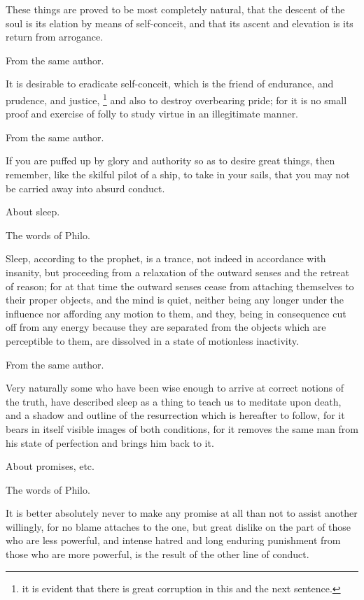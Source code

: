 These things are proved to be most completely natural, that the descent of the soul is its elation by
means of self-conceit, and that its ascent and elevation is its return from arrogance.

From the same author.

It is desirable to eradicate self-conceit, which is the friend of endurance, and prudence, and
justice, \footnote{it is evident that there is great corruption in this and the next sentence.} and also to destroy
overbearing pride; for it is no small proof and exercise of folly to study virtue in an illegitimate
manner.

From the same author.

If you are puffed up by glory and authority so as to desire great things, then remember, like the
skilful pilot of a ship, to take in your sails, that you may not be carried away into absurd conduct.

About sleep.

The words of Philo.

Sleep, according to the prophet, is a trance, not indeed in accordance with insanity, but proceeding
from a relaxation of the outward senses and the retreat of reason; for at that time the outward
senses cease from attaching themselves to their proper objects, and the mind is quiet, neither
being any longer under the influence nor affording any motion to them, and they, being in
consequence cut off from any energy because they are separated from the objects which are
perceptible to them, are dissolved in a state of motionless inactivity.

From the same author.

Very naturally some who have been wise enough to arrive at correct notions of the truth, have
described sleep as a thing to teach us to meditate upon death, and a shadow and outline of the
resurrection which is hereafter to follow, for it bears in itself visible images of both conditions, for it
removes the same man from his state of perfection and brings him back to it.

About promises, etc.

The words of Philo.

It is better absolutely never to make any promise at all than not to assist another willingly, for no
blame attaches to the one, but great dislike on the part of those who are less powerful, and intense
hatred and long enduring punishment from those who are more powerful, is the result of the other
line of conduct.

